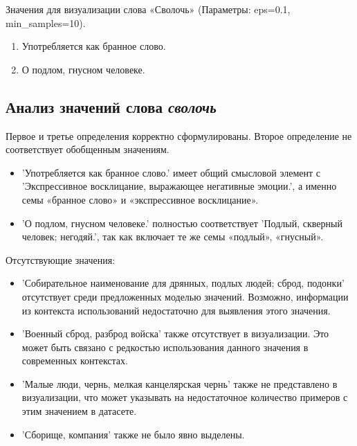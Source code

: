 Значения для визуализации слова «Сволочь» (Параметры: eps=0.1, min\_samples=10).

\begin{enumerate}
    \item Употребляется как бранное слово.
    \item О подлом, гнусном человеке.
\end{enumerate}

\subsection*{Анализ значений слова \textit{сволочь}}

Первое и третье определения корректно сформулированы.
Второе определение не соответствует обобщенным значениям.

\begin{itemize}
    \item ’Употребляется как бранное слово.’ имеет общий смысловой элемент с
’Экспрессивное восклицание, выражающее негативные эмоции.’,
а именно семы «бранное слово» и «экспрессивное восклицание».

    \item ’О подлом, гнусном человеке.’ полностью соответствует
    ’Подлый, скверный человек; негодяй.’, так как включает те же семы «подлый», «гнусный».
\end{itemize}


Отсутствующие значения:
\begin{itemize}
    \item ’Собирательное наименование для дрянных, подлых людей; сброд, подонки’ отсутствует среди предложенных моделью значений.
Возможно, информации из контекста использований недостаточно для выявления этого значения.

    \item ’Военный сброд, разброд войска’ также отсутствует в визуализации.
Это может быть связано с редкостью использования данного значения в современных контекстах.

    \item ’Малые люди, чернь, мелкая канцелярская чернь’ также не представлено в визуализации,
что может указывать на недостаточное количество примеров с этим значением в датасете.

    \item ’Сборище, компания’ также не было явно выделены.
\end{itemize}

